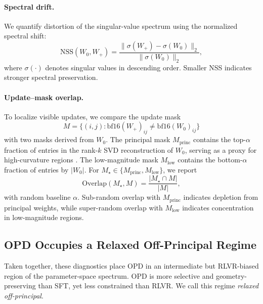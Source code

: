 \documentclass{llmxive}
\begin{document}
\paragraph{Spectral drift.}
We quantify distortion of the singular-value spectrum using the normalized 
spectral shift:
\begin{equation}
 \mathrm{NSS}(W_0,W_+) = \frac{\|\sigma(W_+) - \sigma(W_0)\|_2}
                         {\|\sigma(W_0)\|_2},
\end{equation}
where $\sigma(\cdot)$ denotes singular values in descending order. Smaller NSS 
indicates stronger spectral preservation.

\paragraph{Update--mask overlap.}
To localize visible updates, we compare the update mask
\[
M = \{(i,j): \text{bf16}(W_+)_{ij} \neq \text{bf16}(W_0)_{ij}\}
\]
with two masks derived from $W_0$. The principal mask $M_{\mathrm{princ}}$ 
contains the top-$\alpha$ fraction of entries in the rank-$k$ SVD 
reconstruction of $W_0$, serving as a proxy for high-curvature regions 
\cite{liu2026liftveiltruthprincipal}. The low-magnitude mask $M_{\mathrm{low}}$ contains 
the bottom-$\alpha$ fraction of entries by $|W_0|$. For $M_\star \in \{M_{\mathrm{princ}}, M_{\mathrm{low}}\}$, we report
\vspace{-0.3em}
\[
\mathrm{Overlap}(M_\star,M) = \frac{|M_\star \cap M|}{|M|},
\]
with random baseline $\alpha$. Sub-random overlap with $M_{\mathrm{princ}}$ 
indicates depletion from principal weights, while super-random overlap with 
$M_{\mathrm{low}}$ indicates concentration in low-magnitude regions.







\subsection{OPD Occupies a Relaxed Off-Principal Regime}

Taken together, these diagnostics place OPD in an intermediate but
RLVR-biased region of the parameter-space spectrum. OPD is more selective
and geometry-preserving than SFT, yet less constrained than RLVR. We call
this regime \emph{relaxed off-principal}.
\end{document}
